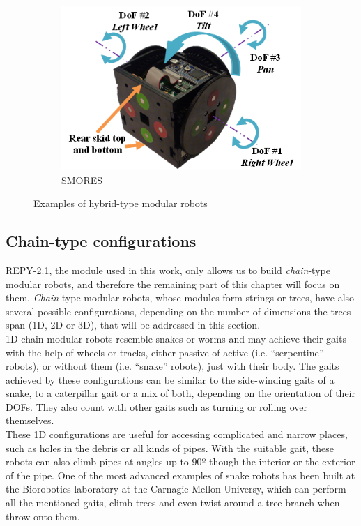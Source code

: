 \begin{figure}[h]
\begin{subfigure}[b]{0.28\textwidth}
                \includegraphics[width=\textwidth]{images/SMORES01.png}
                \caption{SMORES}
                \label{fig:SMORES}
        \end{subfigure}
        \caption{Examples of hybrid-type modular robots}\label{fig:config_hybrid_examples}
\end{figure}



\subsection{Chain-type configurations}
\label{config_chain}

REPY-2.1, the module used in this work, only allows us to build \emph{chain}-type modular robots, and therefore the remaining part of this chapter will focus on them. \emph{Chain}-type modular robots, whose modules form strings or trees, have also several possible configurations, depending on the number of dimensions the trees span (1D, 2D or 3D), that will be addressed in this section.\\

1D chain modular robots resemble snakes or worms and may achieve their gaits with the help of  wheels or tracks, either passive of active (i.e. ``serpentine'' robots), or without them (i.e.  ``snake'' robots), just with their body. The gaits achieved by these configurations can be similar to the side-winding gaits of a snake, to a caterpillar gait or a mix of both, depending on the orientation of their DOFs. They also count with other gaits such as turning or rolling over themselves.\\

These 1D configurations are useful for accessing complicated and narrow places, such as holes in the debris or all kinds of pipes. With the suitable gait, these robots can also climb pipes at angles up to 90º though the interior or the exterior of the pipe. One of the most advanced examples of snake robots has been built at the Biorobotics laboratory at the Carnagie Mellon Universy, which can perform all the mentioned gaits, climb trees and even twist around a tree branch when throw onto them.\\


